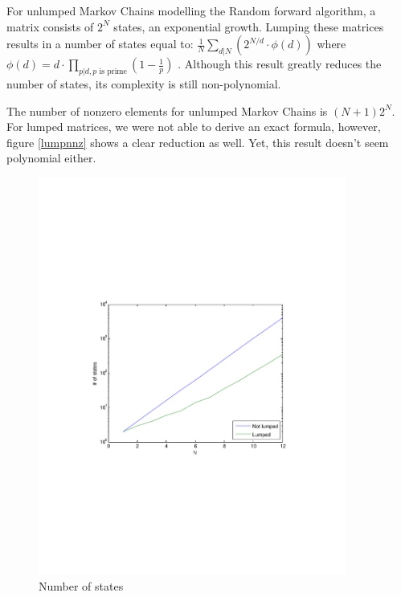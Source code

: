 \documentclass[10pt,a4paper]{article}
\begin{document}
For unlumped Markov Chains modelling the Random forward algorithm, a matrix consists of $2^N$ states, an exponential growth. Lumping these matrices results in a number of states equal to:  $\frac{1}{N} \sum_{d|N} (2^{N/d} \cdot \phi(d) )$ where $\phi(d) = d \cdot \prod_{p|d, p\text{ is prime}} (1-\frac{1}{p})$ \cite{A000031}. Although this result greatly reduces the number of states, its complexity is still non-polynomial.

The number of nonzero elements for unlumped Markov Chains is $(N+1) 2^N$. For lumped matrices, we were not able to derive an exact formula, however, figure \ref{lumpnnz} shows a clear reduction as well. Yet, this result doesn't seem polynomial either.

\begin{figure}[h!tb]
\centering
\includegraphics[clip=true, trim=9em 24em 9em 24em, width=0.9\textwidth]{resources/plotlumping.pdf}
\caption{Number of states}
\label{figlump}
\end{figure}
\end{document}
